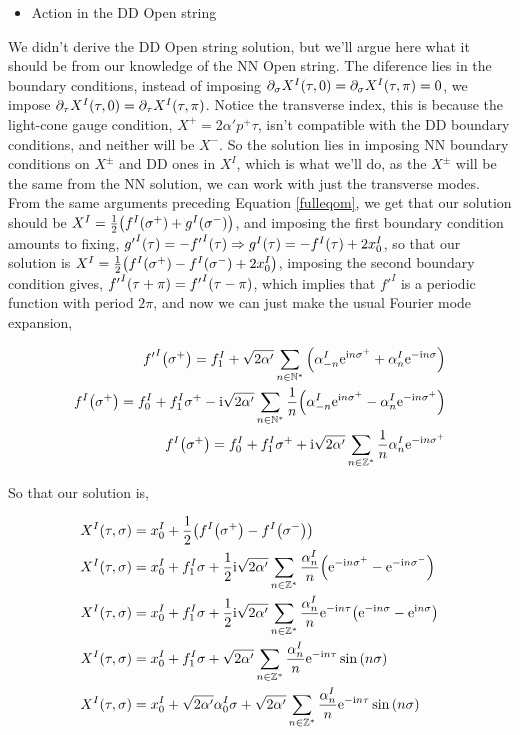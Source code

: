 \begin{itemize}
    \item Action in the DD Open string
\end{itemize}
We didn't derive the DD Open string solution, but we'll argue here what it should be from our knowledge of the NN Open string. The diference lies in
the boundary conditions, instead of imposing $\partial_\sigma X^I\qty(\tau,0)=\partial_\sigma X^I\qty(\tau,\pi)=0$, we impose $\partial_\tau X^I\qty(\tau,0)=\partial_\tau X^I\qty(\tau,\pi)$. 
Notice the transverse index, this is because the light-cone gauge condition, $X^+=2\alpha'p^+\tau$, isn't compatible with the DD boundary conditions, and neither will be $X^-$. 
So the solution lies in imposing NN boundary conditions on $X^\pm$ and DD ones in $X^I$, which is what we'll do, as the $X^\pm$ will be the same from the NN solution, 
we can work with just the transverse modes. From the same arguments preceding Equation \ref{fulleqom}, we get that our solution should be $X^I=\frac12\qty(f^I\qty(\sigma^+)+g^I\qty(\sigma^-))$, and imposing the first
boundary condition amounts to fixing, ${g'}^I\qty(\tau)=-{f'}^I\qty(\tau)\Rightarrow g^I\qty(\tau)=-f^I\qty(\tau)+2x_0^I$, so that our solution is $X^I=\frac12\qty(f^I\qty(\sigma^+)-f^I\qty(\sigma^-)+2x_0^I)$, 
imposing the second boundary condition gives, ${f'}^I\qty(\tau+\pi)={f'}^I\qty(\tau-\pi)$, which implies that ${f'}^I$ is a periodic function with period $2\pi$, and now 
we can just make the usual Fourier mode expansion,

\begin{align*}
    {f'}^I\qty(\sigma^+)=f_1^I+\sqrt{2\alpha'}\sum\limits_{n\in\mathbb N^\ast}\qty(\alpha_{-n}^I\textnormal{e}^{\textnormal{i} n \sigma^+}+\alpha_n^I\textnormal{e}^{-\textnormal{i} n \sigma})\\
    f^I\qty(\sigma^+)=f_0^I+f_1^I\sigma^+-\textnormal{i}\sqrt{2\alpha'}\sum\limits_{n\in\mathbb N^\ast}\frac1n\qty(\alpha_{-n}^I\textnormal{e}^{\textnormal{i} n \sigma^+}-\alpha_n^I\textnormal{e}^{-\textnormal{i} n \sigma^+})\\
    f^I\qty(\sigma^+)=f_0^I+f_1^I\sigma^++\textnormal{i}\sqrt{2\alpha'}\sum\limits_{n\in\mathbb Z^\ast}\frac1n\alpha_n^I\textnormal{e}^{-\textnormal{i} n \sigma^+}
\end{align*}

So that our solution is,

\begin{align*}
    X^I\qty(\tau,\sigma)&=x_0^I+\frac12\qty(f^I\qty(\sigma^+)-f^I\qty(\sigma^-))\\
    X^I\qty(\tau,\sigma)&=x_0^I+f_1^I\sigma+\frac12\textnormal{i}\sqrt{2\alpha'}\sum\limits_{n\in\mathbb Z^\ast}\frac{\alpha_n^I}{n}\qty(\textnormal{e}^{-\textnormal{i} n \sigma^+}-\textnormal{e}^{-\textnormal{i} n \sigma^-})\\
    X^I\qty(\tau,\sigma)&=x_0^I+f_1^I\sigma+\frac12\textnormal{i}\sqrt{2\alpha'}\sum\limits_{n\in\mathbb Z^\ast}\frac{\alpha_n^I}{n}\textnormal{e}^{-\textnormal{i} n \tau}\qty(\textnormal{e}^{-\textnormal{i} n \sigma}-\textnormal{e}^{\textnormal{i} n \sigma})\\
    X^I\qty(\tau,\sigma)&=x_0^I+f_1^I\sigma+\sqrt{2\alpha'}\sum\limits_{n\in\mathbb Z^\ast}\frac{\alpha_n^I}{n}\textnormal{e}^{-\textnormal{i} n \tau}\sin\qty(n\sigma)\\
    X^I\qty(\tau,\sigma)&=x_0^I+\sqrt{2\alpha'}\alpha_0^I\sigma+\sqrt{2\alpha'}\sum\limits_{n\in\mathbb Z^\ast}\frac{\alpha_n^I}{n}\textnormal{e}^{-\textnormal{i} n \tau}\sin\qty(n\sigma)
\end{align*}

